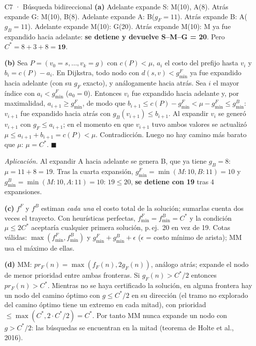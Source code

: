 \begin{solucion}{C7 · Búsqueda bidireccional}
\textbf{(a)} Adelante expande S: M(10), A(8). Atrás expande G: M(10), B(8). Adelante expande A: B($g_F=11$).
Atrás expande B: A($g_B=11$). Adelante expande M(10): G(20). Atrás expande M(10): M ya fue expandido
hacia adelante: \textbf{se detiene y devuelve S–M–G = 20}. Pero $C^*=8+3+8=\mathbf{19}$.

\textbf{(b)} Sea $P=(v_0=s,\dots,v_k=g)$ con $c(P)<\mu$, $a_i$ el costo del prefijo hasta $v_i$ y
$b_i=c(P)-a_i$. En Dijkstra, todo nodo con $d(s,v)<g^F_{\min}$ ya fue expandido hacia adelante (con su
$g_F$ exacto), y análogamente hacia atrás. Sea $i$ el mayor índice con $a_i<g^F_{\min}$ ($a_0=0$). Entonces
$v_i$ fue expandido hacia adelante y, por maximalidad, $a_{i+1}\ge g^F_{\min}$, de modo que
$b_{i+1}\le c(P)-g^F_{\min}<\mu-g^F_{\min}\le g^B_{\min}$: $v_{i+1}$ fue expandido hacia atrás con
$g_B(v_{i+1})\le b_{i+1}$. Al expandir $v_i$ se generó $v_{i+1}$ con $g_F\le a_{i+1}$; en el momento en
que $v_{i+1}$ tuvo ambos valores se actualizó $\mu\le a_{i+1}+b_{i+1}=c(P)<\mu$. Contradicción. Luego no hay
camino más barato que $\mu$: $\mu=C^*$. $\blacksquare$

\emph{Aplicación.} Al expandir A hacia adelante se genera B, que ya tiene $g_B=8$: $\mu=11+8=19$. Tras la
cuarta expansión, $g^F_{\min}=\min(M{:}10,B{:}11)=10$ y $g^B_{\min}=\min(M{:}10,A{:}11)=10$: $19\le20$,
\textbf{se detiene con 19} tras 4 expansiones.

\textbf{(c)} $f^F$ y $f^B$ estiman \emph{cada una} el costo total de la solución; sumarlas cuenta dos veces
el trayecto. Con heurísticas perfectas, $f^F_{\min}=f^B_{\min}=C^*$ y la condición $\mu\le2C^*$ aceptaría
cualquier primera solución, p.\,ej.\ 20 en vez de 19. Cotas válidas: $\max(f^F_{\min},f^B_{\min})$ y
$g^F_{\min}+g^B_{\min}+\epsilon$ ($\epsilon$ = costo mínimo de arista); MM usa el máximo de ellas.

\textbf{(d)} MM: $pr_F(n)=\max(f_F(n),2g_F(n))$, análogo atrás; expande el nodo de menor prioridad entre
ambas fronteras. Si $g_F(n)>C^*/2$ entonces $pr_F(n)>C^*$. Mientras no se haya certificado la solución, en
alguna frontera hay un nodo del camino óptimo con $g\le C^*/2$ en su dirección (el tramo no explorado del
camino óptimo tiene un extremo en cada mitad), con prioridad $\le\max(C^*,2\cdot C^*/2)=C^*$. Por tanto
MM nunca expande un nodo con $g>C^*/2$: las búsquedas se encuentran en la mitad (teorema de Holte et al., 2016).
\end{solucion}

